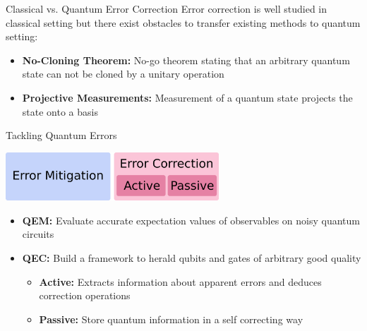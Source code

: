 \documentclass{dfki}
\begin{document}
\begin{frame}{Classical vs. Quantum Error Correction}
	Error correction is well studied in classical setting but there exist obstacles to transfer existing methods to quantum setting:
	\begin{itemize}
		\item \textbf{No-Cloning Theorem:} No-go theorem stating that an arbitrary quantum state can not be cloned by a unitary operation
		\item \textbf{Projective Measurements:} Measurement of a quantum state projects the state onto a basis
	\end{itemize}
\end{frame}

\begin{frame}{Tackling Quantum Errors}
	\begin{center}
        \includegraphics[width=0.6\textwidth]{fig/TypesErrorCorrection.png}
    \end{center}
	\begin{itemize}
		\item \textbf{QEM:} Evaluate accurate expectation values of observables on noisy quantum circuits
		\item \textbf{QEC:} Build a framework to herald qubits and gates of arbitrary good quality
		\begin{itemize}
			\item \textbf{Active:} Extracts information about apparent errors and deduces correction operations
			\item \textbf{Passive:} Store quantum information in a self correcting way \cite{bacon_operator_2006, berthusen_experiments_2024}
		\end{itemize}
	\end{itemize}
\end{frame}
\end{document}
